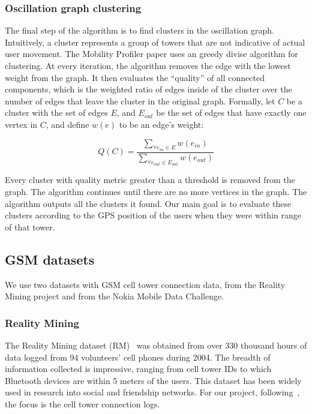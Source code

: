 \documentclass[letterpaper, 12pt, conference]{ieeeconf}
\begin{document}
\subsubsection{Oscillation graph clustering}

The final step of the algorithm is to find clusters in the oscillation graph. 
Intuitively, a cluster represents a group of towers that are not indicative 
of actual user movement. The Mobility Profiler paper uses an greedy divise 
algorithm for clustering. At every iteration, the algorithm removes the edge 
with the lowest weight from the graph. It then evaluates the ``quality'' of 
all connected components, which is the weighted ratio of edges inside of the 
cluster over the number of edges that leave the cluster in the original 
graph. Formally, let $C$ be a cluster with the set of edges $E$, and $E_{out}$
 be the set of edges that have exactly one vertex in $C$, and define $w(e)$ 
to be an edge's weight:

\begin{equation*}
Q(C) = \frac{\displaystyle\sum_{\forall e_{in} \in E}{w(e_{in})}}{
\displaystyle\sum_{\forall e_{out} \in E_{out}}{w(e_{out})}}
\end{equation*}

Every cluster with quality metric greater than a threshold is removed from 
the graph. The algorithm continues until there are no more vertices in the 
graph. The algorithm outputs all the clusters it found. Our main goal is to 
evaluate these clusters according to the GPS position of the users when they 
were within range of that tower.



\subsection{GSM datasets}

We use two datasets with GSM cell tower connection data, from the Reality 
Mining project and from the Nokia Mobile Data Challenge.

\subsubsection{Reality Mining}

The Reality Mining dataset (RM)~\cite{rm} was obtained from over 330 thousand 
hours of data logged from 94 volunteers' cell phones during 2004. The breadth 
of information collected is impressive, ranging from cell tower IDs to which 
Bluetooth devices are within 5 meters of the users. This dataset has been 
widely used in research into social and friendship networks. For our project, 
following~\cite{mobilityprofiler}, the focus is the cell tower connection logs.
\end{document}
